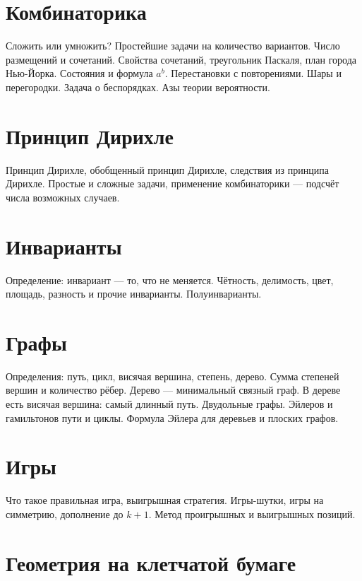 \documentclass[a4paper,11pt,landscape]{article}
\begin{document}
\begin{paracol}{2}
\section{Комбинаторика}

Сложить или умножить? Простейшие задачи на количество вариантов. Число размещений и сочетаний. Свойства сочетаний, треугольник Паскаля, план города Нью-Йорка. Состояния и формула $a^b$\!. Перестановки с повторениями. Шары и перегородки. Задача о беспорядках. Азы теории вероятности.

\section{Принцип Дирихле}

Принцип Дирихле, обобщенный принцип Дирихле, следствия из принципа Дирихле. Простые и сложные задачи, применение комбинаторики — подсчёт числа возможных случаев.

\section{Инварианты}

Определение: инвариант — то, что не меняется. Чётность, делимость, цвет, площадь, разность и прочие инварианты. Полуинварианты.

\switchcolumn
\setcounter{section}{8}

\section{Графы}

Определения: путь, цикл, висячая вершина, степень, дерево. Сумма степеней вершин и количество рёбер. Дерево — минимальный связный граф. В дереве есть висячая вершина: самый длинный путь. Двудольные графы. Эйлеров и гамильтонов пути и циклы. Формула Эйлера для деревьев и плоских графов.

\section{Игры}

Что такое правильная игра, выигрышная стратегия. Игры-шутки, игры на симметрию, дополнение до $k+1$. Метод проигрышных и выигрышных позиций.

\section{Геометрия на клетчатой бумаге}


\end{paracol}
\end{document}
